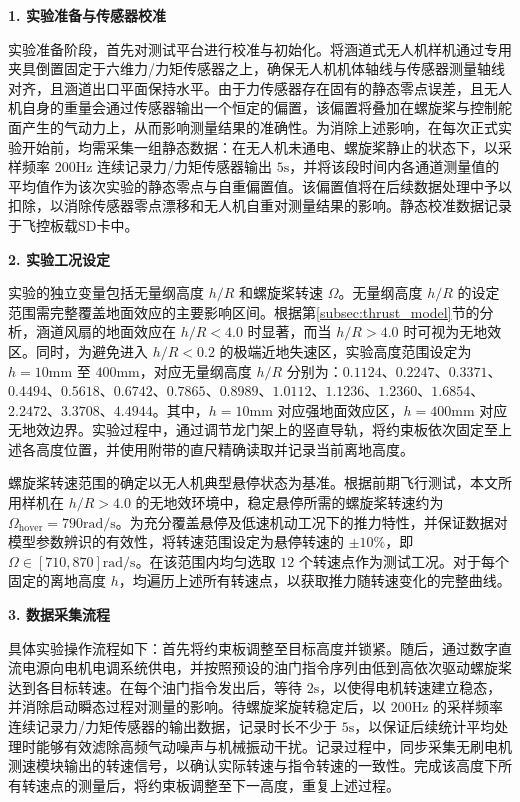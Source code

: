 \textbf{1. 实验准备与传感器校准}

实验准备阶段，首先对测试平台进行校准与初始化。将涵道式无人机样机通过专用夹具倒置固定于六维力/力矩传感器之上，确保无人机机体轴线与传感器测量轴线对齐，且涵道出口平面保持水平。由于力传感器存在固有的静态零点误差，且无人机自身的重量会通过传感器输出一个恒定的偏置，该偏置将叠加在螺旋桨与控制舵面产生的气动力上，从而影响测量结果的准确性。为消除上述影响，在每次正式实验开始前，均需采集一组静态数据：在无人机未通电、螺旋桨静止的状态下，以采样频率 $200\mathrm{Hz}$ 连续记录力/力矩传感器输出 $5\mathrm{s}$，并将该段时间内各通道测量值的平均值作为该次实验的静态零点与自重偏置值。该偏置值将在后续数据处理中予以扣除，以消除传感器零点漂移和无人机自重对测量结果的影响。静态校准数据记录于飞控板载SD卡中。

\textbf{2. 实验工况设定}

实验的独立变量包括无量纲高度 $h/R$ 和螺旋桨转速 $\Omega$。无量纲高度 $h/R$ 的设定范围需完整覆盖地面效应的主要影响区间。根据第\ref{subsec:thrust_model}节的分析，涵道风扇的地面效应在 $h/R < 4.0$ 时显著，而当 $h/R > 4.0$ 时可视为无地效区。同时，为避免进入 $h/R < 0.2$ 的极端近地失速区，实验高度范围设定为 $h = 10\mathrm{mm}$ 至 $400\mathrm{mm}$，对应无量纲高度 $h/R$ 分别为：$0.1124$、$0.2247$、$0.3371$、$0.4494$、$0.5618$、$0.6742$、$0.7865$、$0.8989$、$1.0112$、$1.1236$、$1.2360$、$1.6854$、$2.2472$、$3.3708$、$4.4944$。其中，$h = 10\mathrm{mm}$ 对应强地面效应区，$h = 400\mathrm{mm}$ 对应无地效边界。实验过程中，通过调节龙门架上的竖直导轨，将约束板依次固定至上述各高度位置，并使用附带的直尺精确读取并记录当前离地高度。

螺旋桨转速范围的确定以无人机典型悬停状态为基准。根据前期飞行测试，本文所用样机在 $h/R > 4.0$ 的无地效环境中，稳定悬停所需的螺旋桨转速约为 $\Omega_{\mathrm{hover}} = 790\mathrm{rad/s}$。为充分覆盖悬停及低速机动工况下的推力特性，并保证数据对模型参数辨识的有效性，将转速范围设定为悬停转速的 $\pm 10\%$，即 $\Omega \in [710,870]\mathrm{rad/s}$。在该范围内均匀选取 $12$ 个转速点作为测试工况。对于每个固定的离地高度 $h$，均遍历上述所有转速点，以获取推力随转速变化的完整曲线。

\textbf{3. 数据采集流程}

具体实验操作流程如下：首先将约束板调整至目标高度并锁紧。随后，通过数字直流电源向电机电调系统供电，并按照预设的油门指令序列由低到高依次驱动螺旋桨达到各目标转速。在每个油门指令发出后，等待 $2\mathrm{s}$，以使得电机转速建立稳态，并消除启动瞬态过程对测量的影响。待螺旋桨旋转稳定后，以 $200\mathrm{Hz}$ 的采样频率连续记录力/力矩传感器的输出数据，记录时长不少于 $5\mathrm{s}$，以保证后续统计平均处理时能够有效滤除高频气动噪声与机械振动干扰。记录过程中，同步采集无刷电机测速模块输出的转速信号，以确认实际转速与指令转速的一致性。完成该高度下所有转速点的测量后，将约束板调整至下一高度，重复上述过程。

